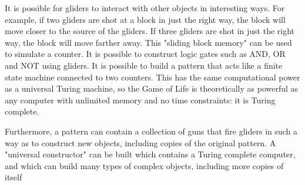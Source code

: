 It is possible for gliders to interact with other objects in interesting ways. For example, if two gliders are shot at a block in just the right way, the block will move closer to the source of the gliders. If three gliders are shot in just the right way, the block will move farther away. This "sliding block memory" can be used to simulate a counter. It is possible to construct logic gates such as AND, OR and NOT using gliders. It is possible to build a pattern that acts like a finite state machine connected to two counters. This has the same computational power as a universal Turing machine, so the Game of Life is theoretically as powerful as any computer with unlimited memory and no time constraints: it is Turing complete.

Furthermore, a pattern can contain a collection of guns that fire gliders in such a way as to construct new objects, including copies of the original pattern. A "universal constructor" can be built which contains a Turing complete computer, and which can build many types of complex objects, including more copies of itself
